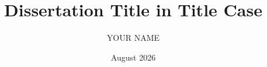 \documentclass[doctoral,12pt]{uofm}
\title{Dissertation Title in Title Case}
\author{YOUR NAME}
\date{August 2026}
\begin{document}
\maketitle
\copyrightpage

\frontmatter



\clearpage
\tableofcontents
\clearpage
\listoffigures
\listoftables

\mainmatter









\end{document}
